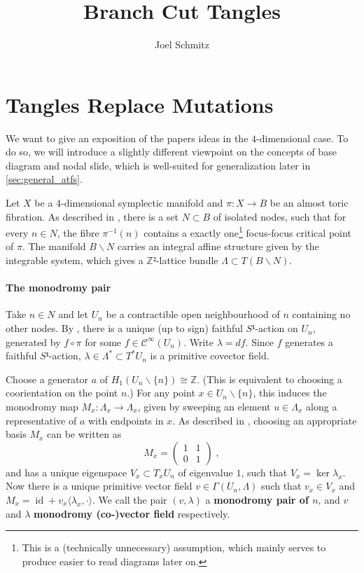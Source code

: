 \documentclass[12pt,a4paper,abstract=true,draft]{scrartcl}
\DeclareMathOperator{\id}{id}
\newcommand\mqty[1]{\begin{pmatrix}#1\end{pmatrix}}
\begin{document}
\title{Branch Cut Tangles}
\author{Joel Schmitz}
\maketitle

\section{Tangles Replace Mutations}

We want to give an exposition of the papers ideas in the $4$-dimensional case.
To do so, we will introduce a slightly different viewpoint on the concepts of base diagram and nodal slide, which is well-suited for generalization later in \cref{sec:general_atfs}.

Let $X$ be a 4-dimensional symplectic manifold and $π \colon X → B$ be an almost toric fibration.
As described in \cite{evans2021atfs}, there is a set $N ⊂ B$ of isolated nodes, such that for every $n ∈ N$, the fibre $π^{-1}(n)$ contains a exactly one\footnote{This is a (technically unnecessary) assumption, which mainly serves to produce easier to read diagrams later on.} focus-focus critical point of $π$.
The manifold $B ∖ N$ carries an integral affine structure given by the integrable system, which gives a $ℤ²$-lattice bundle $Λ ⊂ T(B ∖ N)$.

\paragraph{The monodromy pair}
Take $n ∈ N$ and let $U_n$ be a contractible open neighbourhood of $n$ containing no other nodes.
By \cite[Proposition 1]{Zun97}, there is a unique (up to sign) faithful $S¹$-action on $U_n$, generated by $f ∘ π$ for some $f ∈ 𝒞^∞(U_n)$.
Write $λ = df$.
Since $f$ generates a faithful $S¹$-action, $λ ∈ Λ^* ⊂ T^* U_n$ is a primitive covector field.

Choose a generator $a$ of $H_1(U_n ∖ \{n\}) ≅ ℤ$. (This is equivalent to choosing a coorientation on the point $n$.)
For any point $x ∈ U_n ∖ \{n\}$, this induces the monodromy map $M_x \colon Λ_x → Λ_x$, given by sweeping an element $u ∈ Λ_x$ along a representative of $a$ with endpoints in $x$.
As described in \cite[Lemma 1]{Zun97}, choosing an appropriate basis $M_x$ can be written as
\[ M_x = \mqty{1 & 1\\0 & 1}\; ,\]
and has a unique eigenspace $V_x ⊂ T_x U_n$ of eigenvalue $1$, such that $V_x = \ker λ_x$.
Now there is a unique primitive vector field $v ∈ Γ(U_n,Λ)$ such that $v_x ∈ V_x$ and $M_x = \id + v_x ⟨ λ_x, · ⟩$.
We call the pair $(v,λ)$ a \textbf{monodromy pair of $n$}, and $v$ and $λ$ \textbf{monodromy (co-)vector field} respectively.
\end{document}
